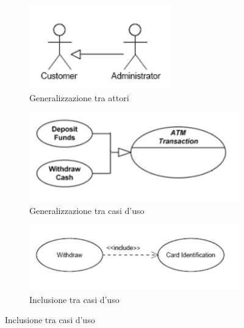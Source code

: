 \documentclass{article}
\begin{document}
	\begin{figure}[h]
		\centering
		\begin{subfigure}[b]{0.3\textwidth}
			\centering
			\includegraphics[width=\textwidth]{30.gen_actor.png}
			\caption{Generalizzazione tra attori}
			\label{fig:im-30}
		\end{subfigure}
		\hfill
		\begin{subfigure}[b]{0.3\textwidth}
			\centering
			\includegraphics[width=\textwidth]{31.gen_use_cases.png}
			\caption{Generalizzazione tra casi d'uso}
			\label{fig:im-31}
		\end{subfigure}
		\hfill
		\begin{subfigure}[b]{0.4\textwidth}
			\centering
			\includegraphics[width=\textwidth]{32.incl_use_cases.png}
			\caption{Inclusione tra casi d'uso}
			\label{fig:im-32}

\end{subfigure}
\end{figure}
\end{document}
